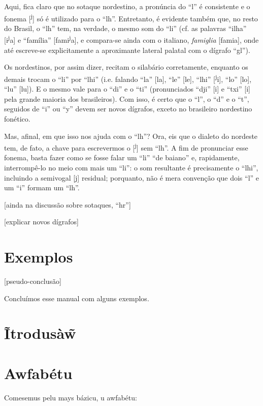 \documentclass[12pt, a5paper, titlepage]{article}
\begin{document}
\begin{bilingualpages}
    Aqui, fica claro que no sotaque nordestino, a pronúncia do ``l'' é consistente e o fonema [\textsuperscript{j}] só é utilizado para o ``lh''. Entretanto, é evidente também que, no resto do Brasil, o ``lh'' tem, na verdade, o mesmo som do ``li'' (cf. as palavras ``ilha'' [\textprimstress i\textsuperscript{j}a] e ``família'' [fa\textprimstress mi\textsuperscript{j}a], e compara-se ainda com o italiano, \textit{famiglia} [fa\textprimstress mi\textturny a], onde até escreve-se explicitamente a aproximante lateral palatal com o dígrafo ``gl'').

    Os nordestinos, por assim dizer, recitam o silabário corretamente, enquanto os demais trocam o ``li'' por ``lhi'' (i.e. falando ``la'' [la], ``le'' [le], ``lhi'' [\textsuperscript{j}i], ``lo'' [lo], ``lu'' [lu]). E o mesmo vale para o ``di'' e o ``ti'' (pronunciados ``dji'' [i] e ``txi'' [i] pela grande maioria dos brasileiros). Com isso, é certo que o ``l'', o ``d'' e o ``t'', seguidos de ``i'' ou ``y'' devem ser novos dígrafos, exceto no brasileiro nordestino fonético.

    Mas, afinal, em que isso nos ajuda com o ``lh''? Ora, eis que o dialeto do nordeste tem, de fato, a chave para escrevermos o [\textsuperscript{j}] sem ``lh''. A fim de pronunciar esse fonema, basta fazer como se fosse falar um ``li'' ``de baiano'' e, rapidamente, interrompê-lo no meio com mais um ``li'': o som resultante é precisamente o ``lhi'', incluindo a semivogal [j] residual; porquanto, não é mera convenção que dois ``l'' e um ``i'' formam um ``lh''.

    [ainda na discussão sobre sotaques, ``hr'']

    [explicar novos dígrafos]


    \section{Exemplos}
     [pseudo-conclusão]

    Concluímos esse manual com alguns exemplos.

    \leftpage
    \section{Ĩtrodusà\~w}

    \newpage
    \section{Awfabétu}
    Comesemus pelu mays bázicu, u awfabétu:
    \BrTableAbc


\end{bilingualpages}
\end{document}

